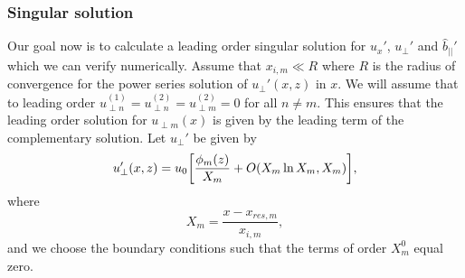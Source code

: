 
\subsubsection{Singular solution}

Our goal  now is to calculate a leading order singular solution for $u_x'$, $u_\perp'$ and $\hat{b}_{||}'$ which we can verify numerically.
Assume that $x_{i,m}\ll R$ where $R$ is the radius of convergence for the power series solution of $u_\perp'(x,z)$ in $x$. We will assume that to leading order $u_{\perp n}^{(1)}=u_{\perp n}^{(2)}=u_{\perp m}^{(2)}=0$ for all $n\ne m$. This ensures that the leading order solution for $u_{\perp m}(x)$ is given by the leading term of the complementary solution. Let $u_\perp'$ be given by
\begin{equation}
    \label{eq:chap_4_oblique_u_perp_final}
    u_\perp'(x,z) = u_0\qty[\frac{\phi_m(z)}{X_{m}} + O(X_m\ln X_m,X_m)],
\end{equation}
where
\begin{equation}
    X_m=\frac{x - x_{res,m}}{x_{i,m}},
\end{equation}
and we choose the boundary conditions such that the terms of order $X_m^0$ equal zero.

